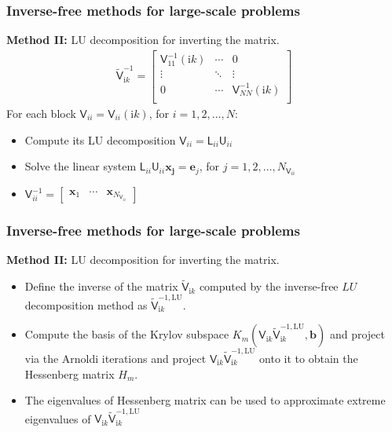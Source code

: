 \documentclass[dvipsnames,10pt]{beamer}
\begin{document}
\begin{frame}
    \frametitle{Inverse-free methods for large-scale problems}
    \vspace{0.3cm}
\textbf{Method II:} LU decomposition for inverting the matrix.
\begin{align*}
    \tilde{\mathsf{V}}_{\mathrm{i}k}^{-1}
=  \begin{bmatrix}
    \mathsf{V}_{11}^{-1}(\mathrm{i}k)    & \cdots & 0 \\
    \vdots                              & \ddots & \vdots \\
       0       & \cdots        & \mathsf{V}_{NN}^{-1} (\mathrm{i}k)\\
\end{bmatrix}
\end{align*}
 For each block $\mathsf{V}_{ii} = \mathsf{V}_{ii}(\mathrm{i}k)$, for $i = 1, 2, \dots, N$:
 \begin{itemize}
     \item Compute its LU decomposition $\mathsf{V}_{ii} = \mathsf{L}_{ii}\mathsf{U}_{ii}$
     \item Solve the linear system $\mathsf{L}_{ii}\mathsf{U}_{ii}\boldsymbol{x_{j}} = \boldsymbol{e}_{j}$, for $j = 1, 2, \dots, N_{\mathsf{V}_{ii}}$
     \item $\mathsf{V}_{ii}^{-1} = \begin{bmatrix}
    \boldsymbol{x}_{1} & \cdots & \boldsymbol{x}_{N_{\mathsf{V}_{ii}}}
\end{bmatrix}$
 \end{itemize}
\end{frame}
\begin{frame}
    \frametitle{Inverse-free methods for large-scale problems}
\textbf{Method II:} LU decomposition for inverting the matrix.
    \vspace{0.3cm}

\begin{itemize}
    \item Define the inverse of the matrix $\tilde{\mathsf{V}}_{\mathrm{i}k}$ computed by the inverse-free $LU$ decomposition method as 
$\tilde{\mathsf{V}}_{\mathrm{i}k}^{-1,\text{LU}}$.
\vspace{0.2cm}
\item Compute the basis of the Krylov subspace 
$K_{m}(\mathsf{V}_{\mathrm{i}k}\tilde{\mathsf{V}}_{\mathrm{i}k}^{-1,\text{LU}}, \boldsymbol{b})$ and project
via the Arnoldi iterations and project $\mathsf{V}_{\mathrm{i}k}\tilde{\mathsf{V}}_{\mathrm{i}k}^{-1,\text{LU}}$ onto it to obtain the Hessenberg matrix $H_{m}$.
\vspace{0.2cm}

\item The eigenvalues of Hessenberg matrix can be used to approximate extreme eigenvalues of $\mathsf{V}_{\mathrm{i}k}\tilde{\mathsf{V}}_{\mathrm{i}k}^{-1,\text{LU}}$

\end{itemize}
\end{frame}
\end{document}
